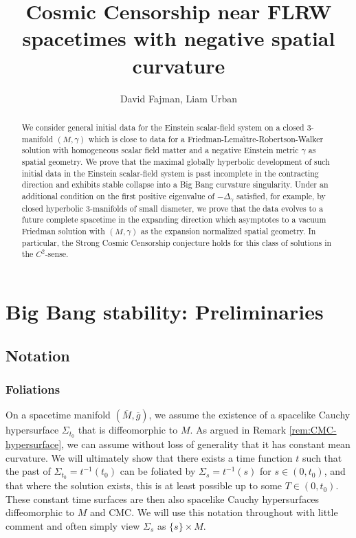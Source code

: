 \documentclass[11pt,leqno,textwidth=10cm]{amsart}
\title{Cosmic Censorship near FLRW spacetimes with negative spatial curvature}
\author[D.~Fajman, L.~Urban]{David Fajman, Liam Urban}
\numberwithin{equation}{section}
\theoremstyle{definition}
\theoremstyle{plain}
\newcommand{\1}{\mathbbm{1}}
\newcommand{\g}{\overline{g}}
\newcommand{\M}{\overline{M}}
\newcommand{\change}[1]{\color{black}#1\color{black}}
\newcommand{\delete}[1]{}
\begin{document}
\maketitle


\begin{abstract}
We consider \change{general initial data }for the Einstein scalar-field system on a closed \delete{orientable }$3$-manifold \change{$(M,\gamma)$ }which is close to data for a Friedman-Lema{\^\i}tre-Robertson-Walker solution with \change{homogeneous }scalar field matter and a negative Einstein metric $\gamma$ as spatial geometry. We prove that \change{the maximal globally hyperbolic development of such initial data in the Einstein scalar-field system is past incomplete in the contracting direction and exhibits stable collapse into a Big Bang curvature singularity}. Under an additional condition on the first positive eigenvalue of \change{$-\Delta_\gamma$ }satisfied, for example, \change{by closed hyperbolic 3-manifolds of small diameter}, we prove that the data evolves to a future complete spacetime in the expanding direction which asymptotes to a vacuum Friedman solution with \change{$(M,\gamma)$ }as the expansion normalized spatial geometry. In particular, the Strong Cosmic Censorship conjecture holds for this class of solutions in the $C^{2}$-sense.
\end{abstract}




\setcounter{tocdepth}{2}





\section{Big Bang stability: Preliminaries}\label{sec:prelim}

\subsection{Notation}\label{subsec:notation}

\subsubsection{Foliations}\label{subsubsec:notation-foliation}

\change{On a spacetime manifold $(\M,\g)$, we assume the existence of a spacelike Cauchy hypersurface $\Sigma_{t_0}$ that is diffeomorphic to $M$. As argued in Remark \ref{rem:CMC-hypersurface}, we can assume without loss of generality that it has constant mean curvature. We will ultimately show that there exists a time function $t$ such that the past of $\Sigma_{t_0}=t^{-1}(t_0)$ can be foliated by $\Sigma_{s}=t^{-1}(s)$ for $s\in (0,t_0)$, and that where the solution exists, this is at least possible up to some $T\in(0,t_0)$. These constant time surfaces are then also spacelike Cauchy hypersurfaces diffeomorphic to $M$ and CMC. We will use this notation throughout with little comment and often simply view $\Sigma_s$ as $\{s\}\times M$.}
\end{document}

